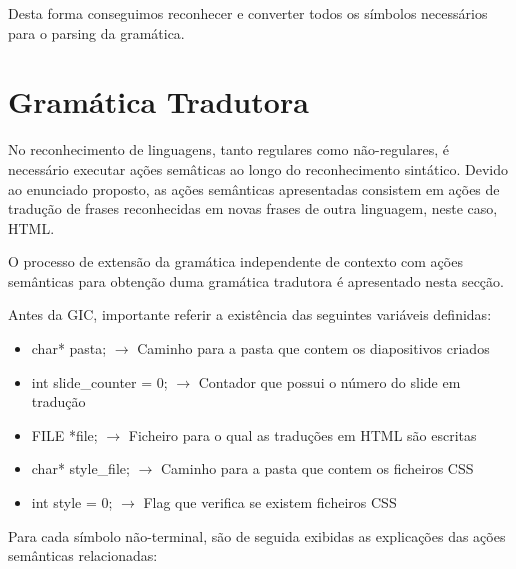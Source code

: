\documentclass[11pt,a4paper]{report}
\begin{document}
\vspace{0.5cm}

Desta forma conseguimos reconhecer e converter todos os símbolos necessários para o parsing da gramática.



\section{Gramática Tradutora}

No reconhecimento de linguagens, tanto regulares como não-regulares, é necessário executar ações semâticas ao longo do reconhecimento sintático. Devido ao enunciado proposto, as ações semânticas apresentadas consistem em ações de tradução de frases reconhecidas em novas frases de outra linguagem, neste caso, HTML.

O processo de extensão da gramática independente de contexto com ações semânticas para obtenção duma gramática tradutora é apresentado nesta secção.

Antes da GIC, importante referir a existência das seguintes variáveis definidas:

\begin{itemize}
	\item char* pasta; $\rightarrow$ Caminho para a pasta que contem os diapositivos criados
	\item int slide\_counter = 0; $\rightarrow$ Contador que possui o número do slide em tradução
	\item FILE *file; $\rightarrow$ Ficheiro para o qual as traduções em HTML são escritas
	\item char* style\_file; $\rightarrow$ Caminho para a pasta que contem os ficheiros CSS
	\item int style = 0; $\rightarrow$ Flag que verifica se existem ficheiros CSS
\end{itemize}


Para cada símbolo não-terminal, são de seguida exibidas as explicações das ações semânticas relacionadas:
\end{document}
